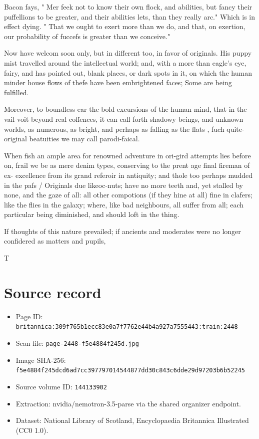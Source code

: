 \documentclass{article}
\begin{document}
Bacon fays, " Mer feek not to know their own flock, and abilities, but fancy their puffellions to be greater, and their abilities lets, than they really arc." Which is in effect dying. " That we ought to exert more than we do, and that, on exertion, our probability of fuccefs is greater than we conceive."

Now have welcom soon only, but in different too, in favor of originals. His puppy mist travelled around the intellectual world; and, with a more than eagle’s eye, fairy, and has pointed out, blank places, or dark spots in it, on which the human minder house flows of thefe have been embrightened faces; Some are being fulfilled.

Moreover, to boundless ear the bold excursions of the human mind, that in the vail voit beyond real coffences, it can call forth shadowy beings, and unknown worlds, as numerous, as bright, and perhaps as falling as the flats , fuch quite-original beatuities we may call parodi-faical.

When fish an ample area for renowned adventure in ori-gird attempts lies before on, frail we be as mere denim types, conserving to the prent age final fireman of ex- excellence from its grand referoir in antiquity; and thole too perhaps mudded in the pafs / Originals due likeoc-nuts; have no more teeth and, yet stalled by none, and the gaze of all: all other compotions (if they hine at all) fine in clafers; like the flies in the galaxy; where, like bad neighbours, all suffer from all; each particular being diminished, and should loft in the thing.

If thoughts of this nature prevailed; if ancients and moderates were no longer confidered as matters and pupils,

T

\section*{Source record}
\begin{itemize}
\item Page ID: \texttt{britannica:309f765b1ecc83e0a7f7762e44b4a927a7555443:train:2448}
\item Scan file: \texttt{page-2448-f5e4884f245d.jpg}
\item Image SHA-256: \texttt{f5e4884f245dcd6ad7cc397797014544877dd30c843c6dde29d97203b6b52245}
\item Source volume ID: \texttt{144133902}
\item Extraction: nvidia/nemotron-3.5-parse via the shared organizer endpoint.
\item Dataset: National Library of Scotland, Encyclopaedia Britannica Illustrated (CC0 1.0).
\end{itemize}
\end{document}
